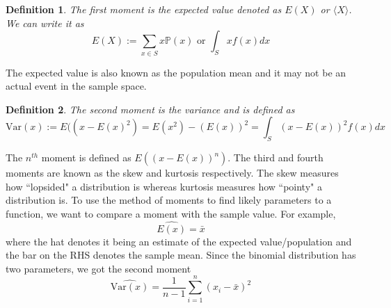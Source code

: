 \documentclass{article}
\newcommand{\p}{\mathbb{P}}
\newtheorem{definition}{Definition}[section]
\begin{document}
\begin{definition}
    The \emph{first moment} is the expected value denoted as $E(X)$ or $\langle X\rangle$. We can write it as 
    \begin{equation*}
        E(X) := \sum_{x\in S}x\p(x) \text{ or }\int_S xf(x)dx 
    \end{equation*}
\end{definition}
The expected value is also known as the population mean and it may not be an actual event in the sample space. 
\begin{definition}
    The \emph{second moment} is the variance and is defined as 
    \begin{equation*}
        \text{Var}(x) := E((x-E(x)^2)=E(x^2)-(E(x))^2 =\int_S (x-E(x))^2f(x)dx
    \end{equation*}
\end{definition}
The $n^{th}$ moment is defined as $E((x-E(x))^n)$. The third and fourth moments are known as the skew and kurtosis respectively. The skew measures how ``lopsided" a distribution is whereas kurtosis measures how ``pointy" a distribution is. To use the method of moments to find likely parameters to a function, we want to compare a moment with the sample value. For example, 
\begin{equation*}
    \widehat{E(x)} = \bar x
\end{equation*}
where the hat denotes it being an estimate of the expected value/population and the bar on the RHS denotes the sample mean. Since the binomial distribution has two parameters, we got the second moment 
\begin{equation*}
    \widehat{\text{Var}(x)} = \frac{1}{n-1}\sum^n_{i=1}(x_i-\bar x)^2
\end{equation*}
\end{document}

